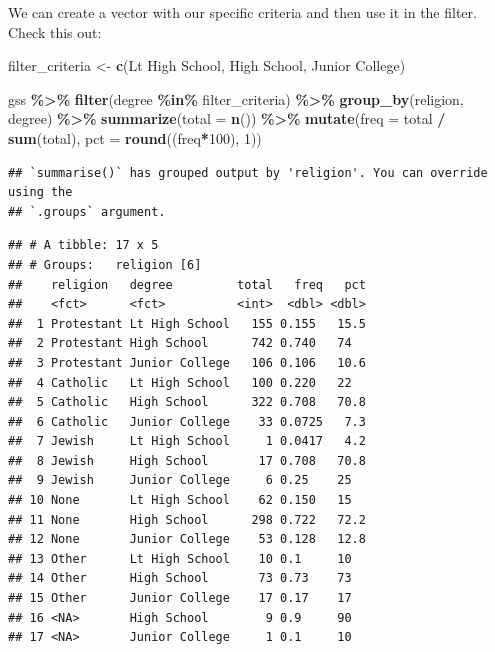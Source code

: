 \documentclass[
]{book}
\newenvironment{Shaded}{\begin{snugshade}}{\end{snugshade}}
\newcommand{\AttributeTok}[1]{\textcolor[rgb]{0.13,0.29,0.53}{#1}}
\newcommand{\DecValTok}[1]{\textcolor[rgb]{0.00,0.00,0.81}{#1}}
\newcommand{\FunctionTok}[1]{\textcolor[rgb]{0.13,0.29,0.53}{\textbf{#1}}}
\newcommand{\NormalTok}[1]{#1}
\newcommand{\OtherTok}[1]{\textcolor[rgb]{0.56,0.35,0.01}{#1}}
\newcommand{\SpecialCharTok}[1]{\textcolor[rgb]{0.81,0.36,0.00}{\textbf{#1}}}
\newcommand{\StringTok}[1]{\textcolor[rgb]{0.31,0.60,0.02}{#1}}
\begin{document}
We can create a vector with our specific criteria and then use it in the filter. Check this out:

\begin{Shaded}
\begin{Highlighting}[]
\NormalTok{filter\_criteria }\OtherTok{\textless{}{-}} \FunctionTok{c}\NormalTok{(}\StringTok{\textquotesingle{}Lt High School\textquotesingle{}}\NormalTok{, }\StringTok{\textquotesingle{}High School\textquotesingle{}}\NormalTok{, }\StringTok{\textquotesingle{}Junior College\textquotesingle{}}\NormalTok{)}

\NormalTok{gss }\SpecialCharTok{\%\textgreater{}\%}
  \FunctionTok{filter}\NormalTok{(degree }\SpecialCharTok{\%in\%}\NormalTok{ filter\_criteria) }\SpecialCharTok{\%\textgreater{}\%}
  \FunctionTok{group\_by}\NormalTok{(religion, degree) }\SpecialCharTok{\%\textgreater{}\%}
  \FunctionTok{summarize}\NormalTok{(}\AttributeTok{total =} \FunctionTok{n}\NormalTok{()) }\SpecialCharTok{\%\textgreater{}\%}
  \FunctionTok{mutate}\NormalTok{(}\AttributeTok{freq =}\NormalTok{ total }\SpecialCharTok{/} \FunctionTok{sum}\NormalTok{(total),}
         \AttributeTok{pct =} \FunctionTok{round}\NormalTok{((freq}\SpecialCharTok{*}\DecValTok{100}\NormalTok{), }\DecValTok{1}\NormalTok{))}
\end{Highlighting}
\end{Shaded}

\begin{verbatim}
## `summarise()` has grouped output by 'religion'. You can override using the
## `.groups` argument.
\end{verbatim}

\begin{verbatim}
## # A tibble: 17 x 5
## # Groups:   religion [6]
##    religion   degree         total   freq   pct
##    <fct>      <fct>          <int>  <dbl> <dbl>
##  1 Protestant Lt High School   155 0.155   15.5
##  2 Protestant High School      742 0.740   74  
##  3 Protestant Junior College   106 0.106   10.6
##  4 Catholic   Lt High School   100 0.220   22  
##  5 Catholic   High School      322 0.708   70.8
##  6 Catholic   Junior College    33 0.0725   7.3
##  7 Jewish     Lt High School     1 0.0417   4.2
##  8 Jewish     High School       17 0.708   70.8
##  9 Jewish     Junior College     6 0.25    25  
## 10 None       Lt High School    62 0.150   15  
## 11 None       High School      298 0.722   72.2
## 12 None       Junior College    53 0.128   12.8
## 13 Other      Lt High School    10 0.1     10  
## 14 Other      High School       73 0.73    73  
## 15 Other      Junior College    17 0.17    17  
## 16 <NA>       High School        9 0.9     90  
## 17 <NA>       Junior College     1 0.1     10
\end{verbatim}
\end{document}
